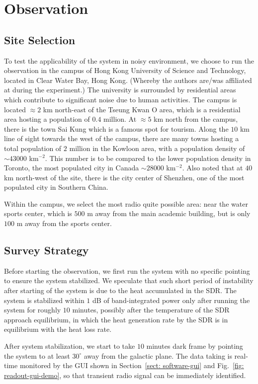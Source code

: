 \documentclass[12pt]{article}
\begin{document}
    \section{Observation} \label{sect: observation}
    \subsection{Site Selection}
    To test the applicability of the system in noisy environment, we choose to run the observation in the campus of Hong Kong University of Science and Technology, located in Clear Water Bay, Hong Kong. (Whereby the authors are/was affiliated at during the experiment.)
    The university is surrounded by residential areas which contribute to significant noise due to human activities. 
    The campus is located $\approx 2$ km north-east of the Tseung Kwan O area, which is a residential area hosting a population of $0.4$ million. 
    At $\approx 5$ km north from the campus, there is the town Sai Kung which is a famous spot for tourism. 
    Along the $10$ km line of sight towards the west of the campus, there are many towns hosting a total population of $2$ million in the Kowloon area, with a population density of $\sim 43000$ km$^{-2}$.
    This number is to be compared to the lower population density in Toronto, the most populated city in Canada $\sim 28000$ km$^{-2}$. 
    Also noted that at $40$ km north-west of the site, there is the city center of Shenzhen, one of the most populated city in Southern China.

    Within the campus, we select the most radio quite possible area: near the water sports center, which is $500$ m away from the main academic building, but is only $100$ m away from the sports center.
    
    \subsection{Survey Strategy}
    Before starting the observation, we first run the system with no specific pointing to ensure the system stabilized. 
    We speculate that such short period of instability after starting of the system is due to the heat accumulated in the SDR. 
    The system is stabilized within $1$ dB of band-integrated power only after running the system for roughly $10$ minutes, possibly after the temperature of the SDR approach equilibrium, in which the heat generation rate by the SDR is in equilibrium with the heat loss rate. 
    
    After system stabilization, we start to take $10$ minutes dark frame by pointing the system to at least $30^\circ$ away from the galactic plane. 
    The data taking is real-time monitored by the GUI shown in Section~\ref{sect: software-gui} and Fig.~\ref{fig: readout-gui-demo}, so that transient radio signal can be immediately identified.
\end{document}
